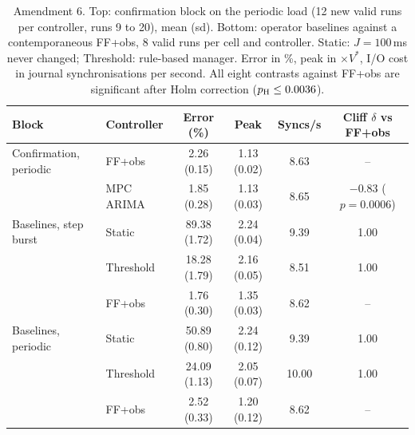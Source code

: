 \begin{table}[t]\centering\small
\caption{Amendment 6. Top: confirmation block on the periodic load (12 new valid runs per controller, runs 9 to 20), mean (sd). Bottom: operator baselines against a contemporaneous FF+obs, 8 valid runs per cell and controller. Static: $J=100$\,ms never changed; Threshold: rule-based manager. Error in \%, peak in $\times V^*$, I/O cost in journal synchronisations per second. All eight contrasts against FF+obs are significant after Holm correction ($p_{\rm H}\le 0.0036$).}\label{tab:amend6}
\begin{tabular}{llcccc}\toprule
Block & Controller & Error (\%) & Peak & Syncs/s & Cliff $\delta$ vs FF+obs\\\midrule
Confirmation, periodic & FF+obs & 2.26 (0.15) & 1.13 (0.02) & 8.63 & --\\
 & MPC ARIMA & 1.85 (0.28) & 1.13 (0.03) & 8.65 & $-0.83$ ($p=0.0006$)\\\midrule
Baselines, step burst & Static & 89.38 (1.72) & 2.24 (0.04) & 9.39 & 1.00\\
 & Threshold & 18.28 (1.79) & 2.16 (0.05) & 8.51 & 1.00\\
 & FF+obs & 1.76 (0.30) & 1.35 (0.03) & 8.62 & --\\\midrule
Baselines, periodic & Static & 50.89 (0.80) & 2.24 (0.12) & 9.39 & 1.00\\
 & Threshold & 24.09 (1.13) & 2.05 (0.07) & 10.00 & 1.00\\
 & FF+obs & 2.52 (0.33) & 1.20 (0.12) & 8.62 & --\\
\bottomrule\end{tabular}\end{table}
